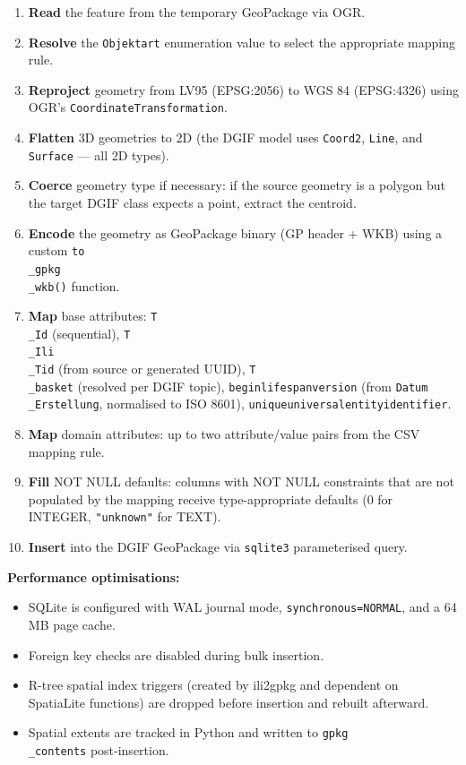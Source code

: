 \documentclass[conference]{IEEEtran}
\begin{document}
\begin{enumerate}[leftmargin=*]
\item \textbf{Read} the feature from the temporary GeoPackage via OGR.
\item \textbf{Resolve} the \texttt{Objektart} enumeration value to select the appropriate mapping rule.
\item \textbf{Reproject} geometry from LV95 (EPSG:2056) to WGS 84 (EPSG:4326) using OGR's \texttt{CoordinateTransformation}.
\item \textbf{Flatten} 3D geometries to 2D (the DGIF model uses \texttt{Coord2}, \texttt{Line}, and \texttt{Surface} — all 2D types).
\item \textbf{Coerce} geometry type if necessary: if the source geometry is a polygon but the target DGIF class expects a point, extract the centroid.
\item \textbf{Encode} the geometry as GeoPackage binary (GP header + WKB) using a custom \texttt{to\\_gpkg\\_wkb()} function.
\item \textbf{Map} base attributes: \texttt{T\\_Id} (sequential), \texttt{T\\_Ili\\_Tid} (from source or generated UUID), \texttt{T\\_basket} (resolved per DGIF topic), \texttt{beginlifespanversion} (from \texttt{Datum\\_Erstellung}, normalised to ISO 8601), \texttt{uniqueuniversalentityidentifier}.
\item \textbf{Map} domain attributes: up to two attribute/value pairs from the CSV mapping rule.
\item \textbf{Fill} NOT NULL defaults: columns with NOT NULL constraints that are not populated by the mapping receive type-appropriate defaults (0 for INTEGER, \texttt{"unknown"} for TEXT).
\item \textbf{Insert} into the DGIF GeoPackage via \texttt{sqlite3} parameterised query.
\end{enumerate}

\textbf{Performance optimisations:}
\begin{itemize}[leftmargin=*]
\item SQLite is configured with WAL journal mode, \texttt{synchronous=NORMAL}, and a 64 MB page cache.
\item Foreign key checks are disabled during bulk insertion.
\item R-tree spatial index triggers (created by ili2gpkg and dependent on SpatiaLite functions) are dropped before insertion and rebuilt afterward.
\item Spatial extents are tracked in Python and written to \texttt{gpkg\\_contents} post-insertion.
\end{itemize}
\end{document}
